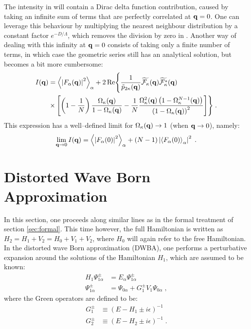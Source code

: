 The intensity in  will contain a Dirac delta function contribution, caused by taking an infinite sum of terms that are perfectly correlated at $\mathbf{q} = 0$. One can leverage this behaviour by multiplying the nearest neighbour distribution by a constant factor $e^{-D/\Lambda}$, which removes the division by zero in .
Another way of dealing with this infinity at $\mathbf{q} =0$ consists of taking only a finite number of terms, in which case the geometric series still has an analytical solution, but becomes a bit more cumbersome:
\begin{equation*}
\begin{split}
  I(\mathbf{q} ) &= \left\langle \left| F_\alpha(\mathbf{q} ) \right| ^2 \right\rangle_{\alpha}  + 2 \operatorname{Re} \Biggl\lbrace \frac{1}{\tilde{p}_{2\kappa}(\mathbf{q} )}\widetilde{\mathcal{F}_\kappa}(\mathbf{q} )\widetilde{\mathcal{F}_\kappa^*}(\mathbf{q} ) \\
  & \times \left[ \left( 1 - \frac{1}{N}\right) \frac{\Omega_\kappa(\mathbf{q} )}{1 - \Omega_\kappa(\mathbf{q} ) } - \frac{1}{N}\frac{\Omega_\kappa^2(\mathbf{q} )\left( 1- \Omega_\kappa^{N-1}(\mathbf{q} )\right) }{\left( 1 - \Omega_\kappa(\mathbf{q} ) \right) ^2 } \right] \Biggr\rbrace \; .
\end{split}
\end{equation*}
This expression has a well--defined limit for $\Omega_\kappa(\mathbf{q} ) \rightarrow 1$ (when $\mathbf{q} \rightarrow 0$), namely:
\begin{equation*}
  \lim_{\mathbf{q} \rightarrow 0} I(\mathbf{q} ) = \left\langle \left| F_\alpha(0 ) \right| ^2 \right\rangle_{\alpha}  + \left( N-1 \right) \left| \left\langle F_\alpha(0 ) \right\rangle_{\alpha}  \right|^2 \; .
\end{equation*}

\section{Distorted Wave Born Approximation} 
In this section, one proceeds along similar lines as in the formal treatment of section \ref{sec:formal}. This time however, the full Hamiltonian is written as $H_2 = H_1 + V_2 = H_0 +V_1 + V_2$, where $H_0$ will again refer to the free Hamiltonian. In the distorted wave Born approximation (DWBA), one performs a perturbative expansion around the solutions of the Hamiltonian $H_1$, which are assumed to be known:
\begin{align*}
  H_1\Psi^\pm_{1\alpha} &= E_\alpha\Psi^\pm_{1\alpha} \\
  \Psi^\pm_{1\alpha} &= \Psi_{0\alpha} + G^\pm_1 V_1 \Psi_{0\alpha} \; ,
\end{align*}
where the Green operators are defined to be:
\begin{align*}
  G^\pm_1 &\equiv (E-H_1\pm i\epsilon) ^{-1} \nonumber \\
  G^\pm_2 &\equiv (E-H_2\pm i\epsilon) ^{-1} \; .
\end{align*}

